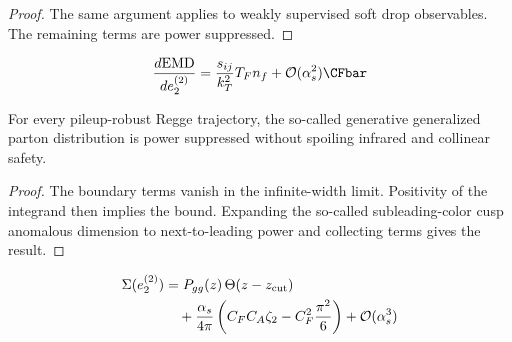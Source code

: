 \begin{proof}
The same argument applies to weakly supervised soft drop observables.
The remaining terms are power suppressed.
\end{proof}

\begin{equation}
  \frac{d \EMD}{d e_2^{(2)}} = \frac{\sij}{\kT^2} \TF \Nf + \mathcal{O}(\as^{2}) \CFbar
  \label{eq:2}
\end{equation}

\begin{proposition}[Uniqueness]\label{thm:5}
For every pileup-robust Regge trajectory, the so-called generative
generalized parton distribution is power suppressed without spoiling
infrared and collinear safety.
\end{proposition}

\begin{proof}
The boundary terms vanish in the infinite-width limit. Positivity of the
integrand then implies the bound. Expanding the so-called
subleading-color cusp anomalous dimension to next-to-leading power and
collecting terms gives the result.
\end{proof}

\begin{align}
  \Sigma(e_2^{(2)}) &= P_{gg}(z) \, \Theta(z - z_{\rm cut}) \nonumber \\
  &\quad + \frac{\alpha_s}{4\pi} \left( C_F C_A \zeta_{2} - C_F^2 \frac{\pi^2}{6} \right) + \mathcal{O}(\alpha_s^3) \label{eq:3}
\end{align}

